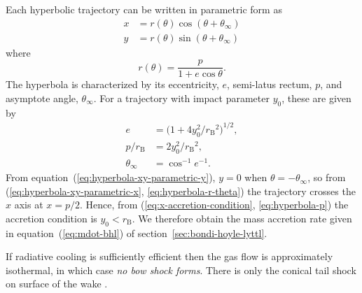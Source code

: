 \documentclass[useAMS, usenatbib, a4paper]{mnras}
\newcommand\bhl{\ensuremath{_{\mathrm{\scriptscriptstyle B}}}}
\begin{document}
Each hyperbolic trajectory can be written in parametric form as
\begin{align}
  \label{eq:hyperbola-xy-parametric-x}
  x &= r(\theta) \cos(\theta + \theta_\infty) \\
  \label{eq:hyperbola-xy-parametric-y}
  y &= r(\theta) \sin(\theta + \theta_\infty)
\end{align}
where
\begin{equation}
  \label{eq:hyperbola-r-theta}
  r(\theta) = \frac{p}{1 + e \cos\theta}.
\end{equation}
The hyperbola is characterized by its eccentricity, \(e\),
semi-latus rectum, \(p\), and asymptote angle, \(\theta_\infty\).
For a trajectory with impact parameter \(y_0\), these are given by
\begin{align}
  \label{eq:hyperbola-eccentricity}
  e & = \bigl( 1 + 4 y_0^2 / r\bhl^2 \bigr)^{1/2},\\
  \label{eq:hyperbola-p}
  p / r\bhl & = 2 y_0^2 / r\bhl^2, \\
  \label{eq:hyperbola-theta-inf}
  \theta_\infty & = \cos^{-1} e^{-1} .
\end{align}
From equation~(\ref{eq:hyperbola-xy-parametric-y}), \(y = 0\) when \(\theta = -\theta_\infty\),
so from (\ref{eq:hyperbola-xy-parametric-x}, \ref{eq:hyperbola-r-theta})
the trajectory crosses the \(x\) axis at \(x = p / 2\).
Hence, from (\ref{eq:x-accretion-condition}, \ref{eq:hyperbola-p})
the accretion condition is \(y_0 < r\bhl\). We therefore obtain the
mass accretion rate given in equation~(\ref{eq:mdot-bhl}) of section~\ref{sec:bondi-hoyle-lyttl}.





If radiative cooling is sufficiently efficient then the gas flow is
approximately isothermal, in which case \emph{no bow shock forms}.
There is only the conical tail shock on surface of the wake
\citep{Ruffert:1996a}.

\bsp	%
\label{lastpage}
\end{document}
